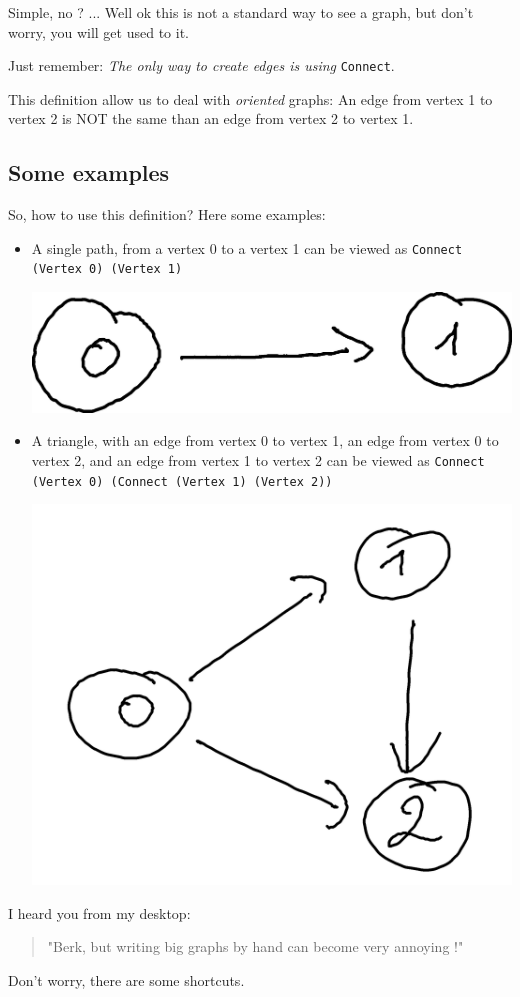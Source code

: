 \documentclass[10pt,a4paper]{article}
\begin{document}
Simple, no ?
...
Well ok this is not a standard way to see a graph, but don't worry, you will get used to it.

Just remember: \emph{The only way to create edges is using} \verb|Connect|.

This definition allow us to deal with \emph{oriented} graphs: An edge from vertex 1 to vertex 2 is NOT the same than an edge from vertex 2 to vertex 1.

\subsection{Some examples}

So, how to use this definition? Here some examples:

\begin{itemize}
	\item A single path, from a vertex 0 to a vertex 1 can be viewed as \verb|Connect (Vertex 0) (Vertex 1)| 
	\begin{center}
	\includegraphics[scale=0.5]{figspng/e2.png}
	\end{center}
	\item A triangle, with an edge from vertex 0 to vertex 1, an edge from vertex 0 to vertex 2, and an edge from vertex 1 to vertex 2 can be viewed as  \verb|Connect (Vertex 0) (Connect (Vertex 1) (Vertex 2))| 
	\begin{center}
	\includegraphics[scale=0.5]{figspng/e1.png}
	\end{center}

\end{itemize}
I heard you from my desktop:
\begin{quote}
	"Berk, but writing big graphs by hand can become very annoying !"
\end{quote}
Don't worry, there are some shortcuts.
\end{document}
